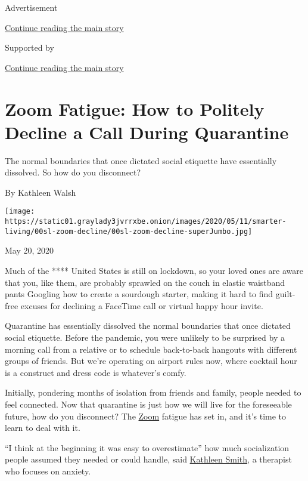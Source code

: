Advertisement

\protect\hyperlink{after-top}{Continue reading the main story}

Supported by

\protect\hyperlink{after-sponsor}{Continue reading the main story}

\hypertarget{zoom-fatigue-how-to-politely-decline-a-call-during-quarantine}{%
\section{Zoom Fatigue: How to Politely Decline a Call During
Quarantine}\label{zoom-fatigue-how-to-politely-decline-a-call-during-quarantine}}

The normal boundaries that once dictated social etiquette have
essentially dissolved. So how do you disconnect?

By Kathleen Walsh

\texttt{[image: https://static01.graylady3jvrrxbe.onion/images/2020/05/11/smarter-living/00sl-zoom-decline/00sl-zoom-decline-superJumbo.jpg]}

May 20, 2020

Much of the **** United States is still on lockdown, so your loved ones
are aware that you, like them, are probably sprawled on the couch in
elastic waistband pants Googling how to create a sourdough starter,
making it hard to find guilt-free excuses for declining a FaceTime call
or virtual happy hour invite.

Quarantine has essentially dissolved the normal boundaries that once
dictated social etiquette. Before the pandemic, you were unlikely to be
surprised by a morning call from a relative or to schedule back-to-back
hangouts with different groups of friends. But we're operating on
airport rules now, where cocktail hour is a construct and dress code is
whatever's comfy.

Initially, pondering months of isolation from friends and family, people
needed to feel connected. Now that quarantine is just how we will live
for the foreseeable future, how do you disconnect? The
\href{https://www.nytimes3xbfgragh.onion/2020/06/11/technology/zoom-china-tiananmen-square.html}{Zoom}
fatigue has set in, and it's time to learn to deal with it.

``I think at the beginning it was easy to overestimate'' how much
socialization people assumed they needed or could handle, said
\href{https://kathleensmith.net/}{Kathleen Smith}, a therapist who
focuses on anxiety.

